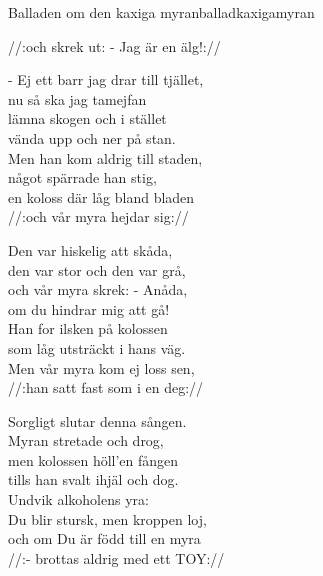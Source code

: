 \begin{song}{Balladen om den kaxiga myran}{balladkaxigamyran}
\begin{vers}
//:och skrek ut: - Jag är en älg!://\\
\end{vers}
\begin{vers}
- Ej ett barr jag drar till tjället,\\
nu så ska jag tamejfan\\
lämna skogen och i stället\\
vända upp och ner på stan.\\
Men han kom aldrig till staden,\\
något spärrade han stig,\\
en koloss där låg bland bladen\\
//:och vår myra hejdar sig://\\
\end{vers}
\begin{vers}
Den var hiskelig att skåda,\\
den var stor och den var grå,\\
och vår myra skrek: - Anåda,\\
om du hindrar mig att gå!\\
Han for ilsken på kolossen\\
som låg utsträckt i hans väg.\\
Men vår myra kom ej loss sen,\\
//:han satt fast som i en deg://\\
\end{vers}

\newp

\begin{vers}
Sorgligt slutar denna sången.\\
Myran stretade och drog,\\
men kolossen höll'en fången\\
tills han svalt ihjäl och dog.\\
Undvik alkoholens yra:\\
Du blir stursk, men kroppen loj,\\
och om Du är född till en myra\\
//:- brottas aldrig med ett TOY://\\
\end{vers}
\end{song}
